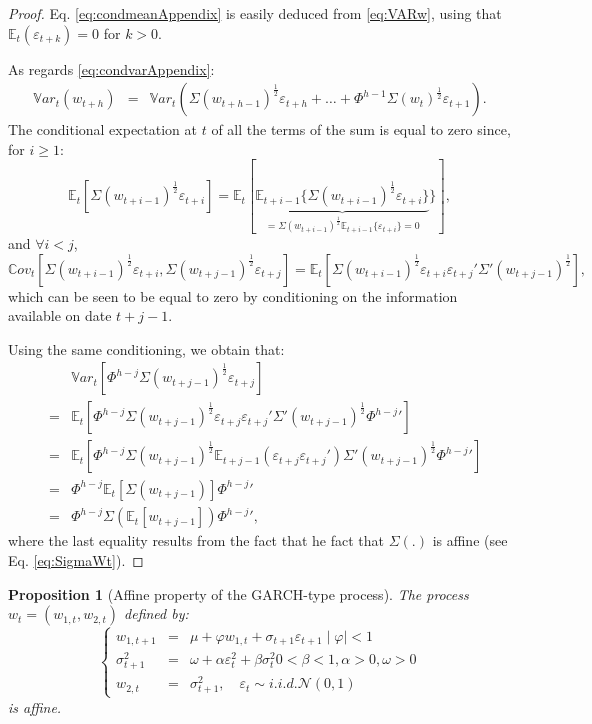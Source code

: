 \documentclass[
  12pt,
]{book}
\newtheorem{proposition}{Proposition}[chapter]
\theoremstyle{definition}
\theoremstyle{definition}
\theoremstyle{definition}
\theoremstyle{definition}
\theoremstyle{remark}
\begin{document}
\begin{proof}
Eq. \eqref{eq:condmeanAppendix} is easily deduced from \eqref{eq:VARw}, using that \(\mathbb{E}_t(\varepsilon_{t+k})=0\) for \(k>0\).

As regards \eqref{eq:condvarAppendix}:
\begin{eqnarray*}
\mathbb{V}ar_t(w_{t+h}) &=& \mathbb{V}ar_t\left(\Sigma(w_{t+h-1})^{\frac{1}{2}}\varepsilon_{t+h}+\dots + \Phi^{h-1} \Sigma(w_{t})^{\frac{1}{2}}\varepsilon_{t+1} \right).
\end{eqnarray*}
The conditional expectation at \(t\) of all the terms of the sum is equal to zero since, for \(i \ge 1\):
\[
\mathbb{E}_t\left[\Sigma(w_{t+i-1})^{\frac{1}{2}}\varepsilon_{t+i}\right] = \mathbb{E}_t[\underbrace{\mathbb{E}_{t+i-1}\{\Sigma(w_{t+i-1})^{\frac{1}{2}}\varepsilon_{t+i}\}}_{=\Sigma(w_{t+i-1})^{\frac{1}{2}}\mathbb{E}_{t+i-1}\{\varepsilon_{t+i}\}=0}\}],
\]
and \(\forall i <j\),
\[
\mathbb{C}ov_t\left[\Sigma(w_{t+i-1})^{\frac{1}{2}}\varepsilon_{t+i},\Sigma(w_{t+j-1})^{\frac{1}{2}}\varepsilon_{t+j}\right] = \mathbb{E}_t\left[\Sigma(w_{t+i-1})^{\frac{1}{2}}\varepsilon_{t+i}\varepsilon_{t+j}'\Sigma'(w_{t+j-1})^{\frac{1}{2}}\right],
\]
which can be seen to be equal to zero by conditioning on the information available on date \(t+j-1\).

Using the same conditioning, we obtain that:
\begin{eqnarray*}
&&\mathbb{V}ar_t\left[\Phi^{h-j}\Sigma(w_{t+j-1})^{\frac{1}{2}}\varepsilon_{t+j}\right]\\
&=& \mathbb{E}_t\left[\Phi^{h-j}\Sigma(w_{t+j-1})^{\frac{1}{2}}\varepsilon_{t+j}\varepsilon_{t+j}'\Sigma'(w_{t+j-1})^{\frac{1}{2}}{\Phi^{h-j}}'\right] \\
&=&  \mathbb{E}_t\left[\Phi^{h-j}\Sigma(w_{t+j-1})^{\frac{1}{2}} \mathbb{E}_{t+j-1}(\varepsilon_{t+j}\varepsilon_{t+j}')\Sigma'(w_{t+j-1})^{\frac{1}{2}}{\Phi^{h-j}}'\right] \\
&=&  \Phi^{h-j}\mathbb{E}_t[\Sigma(w_{t+j-1})]{\Phi^{h-j}}' \\
&=&  \Phi^{h-j}\Sigma(\mathbb{E}_t[w_{t+j-1}]){\Phi^{h-j}}',
\end{eqnarray*}
where the last equality results from the fact that he fact that \(\Sigma(.)\) is affine (see Eq. \eqref{eq:SigmaWt}).
\end{proof}

\begin{proposition}[Affine property of the GARCH-type process]
\protect\hypertarget{prp:GARCH}{}\label{prp:GARCH}The process \(w_t = (w_{1,t}, w_{2,t})\) defined by:
\[
\left\{
\begin{array}{ccl}
w_{1, t+1} &=& \mu + \varphi w_{1,t} + \sigma_{t+1} \varepsilon_{t+1}    \mid \varphi \mid < 1 \\
\sigma^2_{t+1} &=& \omega + \alpha \varepsilon^2_t + \beta \sigma^2_t      0 < \beta < 1, \alpha > 0, \omega > 0    \\
w_{2,t} &=& \sigma^2_{t+1}, \quad \varepsilon_t \sim   i.i.d.   \mathcal{N}(0,1)
\end{array}
\right.
\]
is affine.
\end{proposition}
\end{document}
